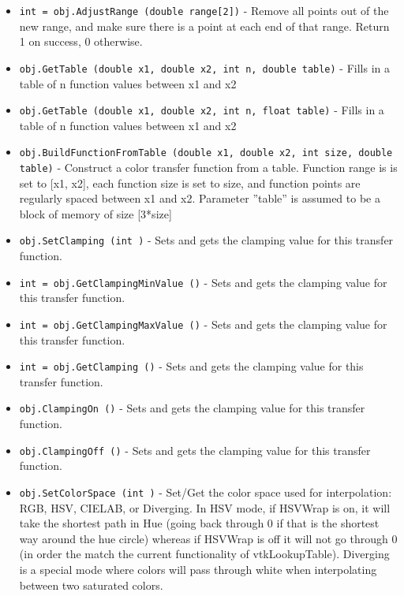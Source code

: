 \begin{itemize}
\item  \verb|int = obj.AdjustRange (double range[2])| -  Remove all points out of the new range, and make sure there is a point
 at each end of that range.
 Return 1 on success, 0 otherwise.

\item  \verb|obj.GetTable (double x1, double x2, int n, double table)| -  Fills in a table of n function values between x1 and x2

\item  \verb|obj.GetTable (double x1, double x2, int n, float table)| -  Fills in a table of n function values between x1 and x2

\item  \verb|obj.BuildFunctionFromTable (double x1, double x2, int size, double table)| -  Construct a color transfer function from a table. Function range is
 is set to [x1, x2], each function size is set to size, and function 
 points are regularly spaced between x1 and x2. Parameter ''table'' is 
 assumed to be a block of memory of size [3*size]

\item  \verb|obj.SetClamping (int )| -  Sets and gets the clamping value for this transfer function.

\item  \verb|int = obj.GetClampingMinValue ()| -  Sets and gets the clamping value for this transfer function.

\item  \verb|int = obj.GetClampingMaxValue ()| -  Sets and gets the clamping value for this transfer function.

\item  \verb|int = obj.GetClamping ()| -  Sets and gets the clamping value for this transfer function.

\item  \verb|obj.ClampingOn ()| -  Sets and gets the clamping value for this transfer function.

\item  \verb|obj.ClampingOff ()| -  Sets and gets the clamping value for this transfer function.

\item  \verb|obj.SetColorSpace (int )| -  Set/Get the color space used for interpolation: RGB, HSV, CIELAB, or
 Diverging.  In HSV mode, if HSVWrap is on, it will take the shortest path
 in Hue (going back through 0 if that is the shortest way around the hue
 circle) whereas if HSVWrap is off it will not go through 0 (in order the
 match the current functionality of vtkLookupTable).  Diverging is a special
 mode where colors will pass through white when interpolating between two
 saturated colors.


\end{itemize}

